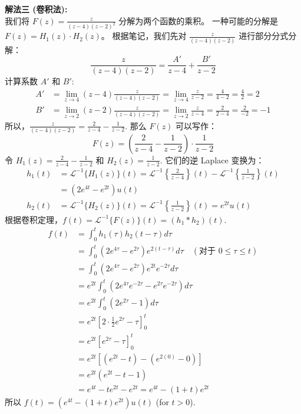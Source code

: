 \documentclass[linespread=1.5,openany]{book}%
\def\diff{d}%
\theoremstyle{plain}
\newcommand{\diff}{\mathop{}\!\mathrm{d}}  %
\begin{document}
{{{{{{{									\noindent\textbf{解法三 (卷积法):} \\
									我们将 $F(z) = \frac{z}{(z-4)(z-2)^2}$ 分解为两个函数的乘积。
									一种可能的分解是 $F(z) = H_1(z) \cdot H_2(z)$。
									根据笔记，我们先对 $\frac{z}{(z-4)(z-2)}$ 进行部分分式分解：
									\[ \frac{z}{(z-4)(z-2)} = \frac{A'}{z-4} + \frac{B'}{z-2} \]
									计算系数 $A'$ 和 $B'$:
									\begin{align*}
										A' &= \lim_{z\to 4} (z-4) \frac{z}{(z-4)(z-2)} = \lim_{z\to 4} \frac{z}{z-2} = \frac{4}{4-2} = \frac{4}{2} = 2 \\[6pt]
										B' &= \lim_{z\to 2} (z-2) \frac{z}{(z-4)(z-2)} = \lim_{z\to 2} \frac{z}{z-4} = \frac{2}{2-4} = \frac{2}{-2} = -1
									\end{align*}
									所以，$\frac{z}{(z-4)(z-2)} = \frac{2}{z-4} - \frac{1}{z-2}$.
									那么 $F(z)$ 可以写作：
									\[ F(z) = \left( \frac{2}{z-4} - \frac{1}{z-2} \right) \cdot \frac{1}{z-2} \]
									令 $H_1(z) = \frac{2}{z-4} - \frac{1}{z-2}$ 和 $H_2(z) = \frac{1}{z-2}$.
									它们的逆 Laplace 变换为：
									\begin{align*}
										h_1(t) &= \mathcal{L}^{-1}\{H_1(z)\}(t) = \mathcal{L}^{-1}\left\{\frac{2}{z-4}\right\}(t) - \mathcal{L}^{-1}\left\{\frac{1}{z-2}\right\}(t) \\[6pt]
										&= (2e^{4t} - e^{2t})u(t) \\[6pt]
										h_2(t) &= \mathcal{L}^{-1}\{H_2(z)\}(t) = \mathcal{L}^{-1}\left\{\frac{1}{z-2}\right\}(t) = e^{2t}u(t)
									\end{align*}
									根据卷积定理，$f(t) = \mathcal{L}^{-1}\{F(z)\}(t) = (h_1 * h_2)(t)$.
									\begin{align*}
										f(t) &= \int_0^t h_1(\tau) h_2(t-\tau) \diff \tau \\[6pt]
										&= \int_0^t (2e^{4\tau} - e^{2\tau}) e^{2(t-\tau)} \diff \tau \quad (\text{对于 } 0 \le \tau \le t) \\[6pt]
										&= \int_0^t (2e^{4\tau} - e^{2\tau}) e^{2t}e^{-2\tau} \diff \tau \\[6pt]
										&= e^{2t} \int_0^t (2e^{4\tau}e^{-2\tau} - e^{2\tau}e^{-2\tau}) \diff \tau \\[6pt]
										&= e^{2t} \int_0^t (2e^{2\tau} - 1) \diff \tau \\[6pt]
										&= e^{2t} \left[ 2 \cdot \frac{1}{2}e^{2\tau} - \tau \right]_0^t \\[6pt]
										&= e^{2t} \left[ e^{2\tau} - \tau \right]_0^t \\[6pt]
										&= e^{2t} \left[ (e^{2t} - t) - (e^{2(0)} - 0) \right] \\[6pt]
										&= e^{2t} (e^{2t} - t - 1) \\[6pt]
										&= e^{4t} - te^{2t} - e^{2t} = e^{4t} - (1+t)e^{2t}
									\end{align*}
									所以 $f(t) = (e^{4t} - (1+t)e^{2t})u(t)$ (for $t>0$).
									\vspace{\baselineskip}
									
}}}}}}}
\end{document}

